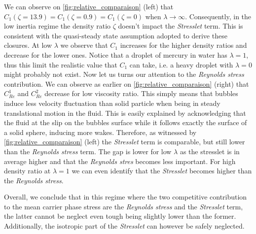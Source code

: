 We can observe on \ref{fig:relative_comparaison} (left) that $C_1(\zeta = 13.9)=C_1(\zeta = 0.9)=C_1(\zeta = 0)$ when $\lambda \to \infty$.
Consequently, in the low inertia regime the density ratio $\zeta$ doesn't impact the \textit{Stresslet} term. 
This is consistent with the quasi-steady state assumption adopted to derive these closures. 
At low $\lambda$ we observe that $C_1$ increases for the higher density ratios and decrease for the lower ones. 
Notice that a droplet of mercury in water has $\lambda =1$, thus this limit the realistic value that $C_1$ can take, i.e. a heavy droplet with $\lambda = 0$ might probably not exist. 
Now let us turns our attention to the \textit{Reynolds stress} contribution. 
We can observe as earlier on \ref{fig:relative_comparaison} (right) that $C_{Re}^1$ and $C_{Re}^2$ decrease for low viscosity ratio. 
This simply means that bubbles induce less velocity fluctuation than solid particle when being in steady translational motion in the fluid. 
This is easily explained by acknowledging that the fluid at the slip on the bubbles surface while it follows exactly the surface of a solid sphere, inducing more wakes. 
Therefore, as witnessed by \ref{fig:relative_comparaison} (left) the \textit{Stresslet} term is comparable, but still lower than the \textit{Reynolds stress} term.
The gap is lower for low $\lambda$ as the stresslet is in average higher and that the \textit{Reynolds stres} becomes less important. 
For high density ratio at $\lambda =1$ we can even identify that the \textit{Stresslet} becomes higher than the \textit{Reynolds stress}. 


Overall, we conclude that in this regime where the two competitive contribution to the mean carrier phase stress are the \textit{Reynolds stress} and the \textit{Stresslet} term, the latter cannot be neglect even tough being slightly lower than the former. 
Additionally, the isotropic part of the \textit{Stresslet} can however be safely neglected. 